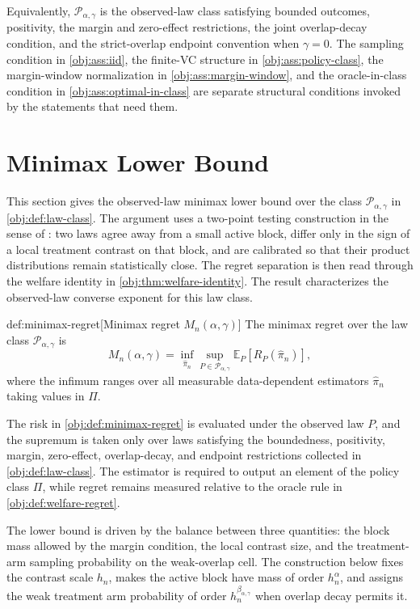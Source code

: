 \documentclass[11pt]{article}
\begin{document}
Equivalently, \(\mathcal P_{\alpha,\gamma}\) is the observed-law class satisfying bounded outcomes, positivity, the margin and zero-effect restrictions, the joint overlap-decay condition, and the strict-overlap endpoint convention when \(\gamma=0\).  The sampling condition in \cref{obj:ass:iid}, the finite-VC structure in \cref{obj:ass:policy-class}, the margin-window normalization in \cref{obj:ass:margin-window}, and the oracle-in-class condition in \cref{obj:ass:optimal-in-class} are separate structural conditions invoked by the statements that need them.


\section{Minimax Lower Bound}

This section gives the observed-law minimax lower bound over the class \(\mathcal P_{\alpha,\gamma}\) in \cref{obj:def:law-class}.  The argument uses a two-point testing construction in the sense of \citet{LeCam1986}: two laws agree away from a small active block, differ only in the sign of a local treatment contrast on that block, and are calibrated so that their product distributions remain statistically close.  The regret separation is then read through the welfare identity in \cref{obj:thm:welfare-identity}.  The result characterizes the observed-law converse exponent for this law class.

\begin{definitionv}{def:minimax-regret}[Minimax regret $M_n(\alpha,\gamma)$]
The minimax regret over the law class \(\mathcal P_{\alpha,\gamma}\) is
\[
M_n(\alpha,\gamma)
=
\inf_{\widehat\pi_n}
\sup_{P\in\mathcal P_{\alpha,\gamma}}
\mathbb E_P\!\left[
R_P(\widehat\pi_n)
\right],
\]
where the infimum ranges over all measurable data-dependent estimators \(\widehat\pi_n\) taking values in \(\Pi\).
\end{definitionv}

The risk in \cref{obj:def:minimax-regret} is evaluated under the observed law \(P\), and the supremum is taken only over laws satisfying the boundedness, positivity, margin, zero-effect, overlap-decay, and endpoint restrictions collected in \cref{obj:def:law-class}.  The estimator is required to output an element of the policy class \(\Pi\), while regret remains measured relative to the oracle rule in \cref{obj:def:welfare-regret}.

The lower bound is driven by the balance between three quantities: the block mass allowed by the margin condition, the local contrast size, and the treatment-arm sampling probability on the weak-overlap cell.  The construction below fixes the contrast scale \(h_n\), makes the active block have mass of order \(h_n^\alpha\), and assigns the weak treatment arm probability of order \(h_n^{\beta_{\alpha,\gamma}}\) when overlap decay permits it.
\end{document}

